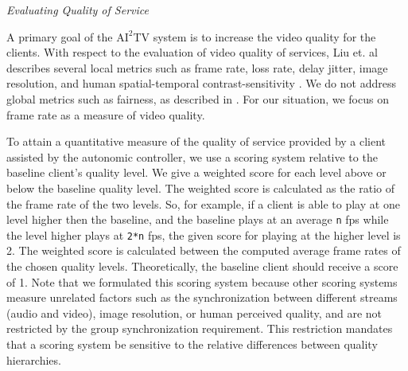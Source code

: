 \documentclass{sig-alternate}
\begin{document}



\textit{Evaluating Quality of Service} 

A primary goal of the $\mathrm{AI}^2$TV system is to increase the
video quality for the clients.  With respect to the evaluation of
video quality of services, Liu et. al describes several local metrics
such as frame rate, loss rate, delay jitter, image resolution, and
human spatial-temporal contrast-sensitivity \cite{LIU2003}.  We do not
address global metrics such as fairness, as described in
\cite{LIU2003}.  For our situation, we focus on frame rate as a
measure of video quality.

To attain a quantitative measure of the quality of service provided by
a client assisted by the autonomic controller, we use a scoring system
relative to the baseline client's quality level.  We give a weighted
score for each level above or below the baseline quality level.  The
weighted score is calculated as the ratio of the frame rate of the two
levels.  So, for example, if a client is able to play at one level
higher then the baseline, and the baseline plays at an average
\texttt{n} fps while the level higher plays at \texttt{2*n} fps, the
given score for playing at the higher level is 2.  The weighted score
is calculated between the computed average frame rates of the chosen
quality levels.  Theoretically, the baseline client should receive a
score of 1.  Note that we formulated this scoring system because other
scoring systems \cite{BAQAI,CORTE,CONWAY2000} measure unrelated
factors such as the synchronization between different streams (audio
and video), image resolution, or human perceived quality, and are not
restricted by the group synchronization requirement.  This restriction
mandates that a scoring system be sensitive to the relative
differences between quality hierarchies.
\end{document}
